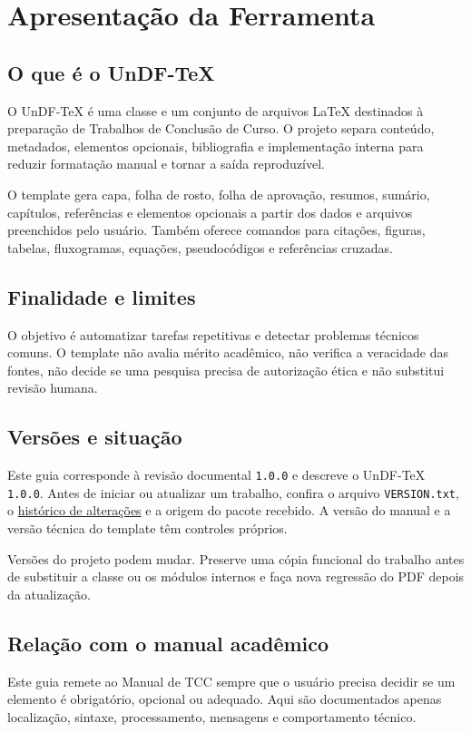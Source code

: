 \chapter{Apresentação da Ferramenta}

\section{O que é o UnDF-TeX}

O UnDF-TeX é uma classe e um conjunto de arquivos LaTeX destinados à preparação de Trabalhos de Conclusão de Curso. O projeto separa conteúdo, metadados, elementos opcionais, bibliografia e implementação interna para reduzir formatação manual e tornar a saída reproduzível.

O template gera capa, folha de rosto, folha de aprovação, resumos, sumário, capítulos, referências e elementos opcionais a partir dos dados e arquivos preenchidos pelo usuário. Também oferece comandos para citações, figuras, tabelas, fluxogramas, equações, pseudocódigos e referências cruzadas.

\section{Finalidade e limites}

O objetivo é automatizar tarefas repetitivas e detectar problemas técnicos comuns. O template não avalia mérito acadêmico, não verifica a veracidade das fontes, não decide se uma pesquisa precisa de autorização ética e não substitui revisão humana.


\section{Versões e situação}

Este guia corresponde à revisão documental \texttt{1.0.0} e descreve o UnDF-TeX \texttt{1.0.0}. Antes de iniciar ou atualizar um trabalho, confira o arquivo \texttt{VERSION.txt}, o \href{https://github.com/igormrqs/undftex/blob/feature/perfis-tcc/CHANGELOG.md}{histórico de alterações} e a origem do pacote recebido. A versão do manual e a versão técnica do template têm controles próprios.

Versões do projeto podem mudar. Preserve uma cópia funcional do trabalho antes de substituir a classe ou os módulos internos e faça nova regressão do PDF depois da atualização.

\section{Relação com o manual acadêmico}

Este guia remete ao Manual de TCC sempre que o usuário precisa decidir se um elemento é obrigatório, opcional ou adequado. Aqui são documentados apenas localização, sintaxe, processamento, mensagens e comportamento técnico.
